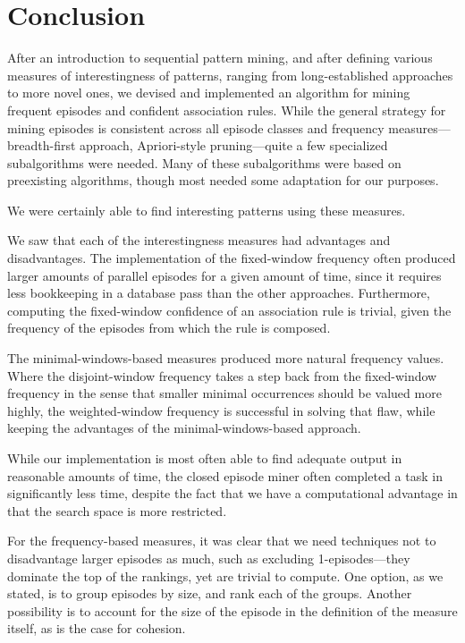 \chapter{Conclusion}


After an introduction to sequential pattern mining, and after defining various measures of interestingness of patterns, ranging from long-established approaches to more novel ones, we devised and implemented an algorithm for mining frequent episodes and confident association rules. While the general strategy for mining episodes is consistent across all episode classes and frequency measures---breadth-first approach, Apriori-style pruning---quite a few specialized subalgorithms were needed. Many of these subalgorithms were based on preexisting algorithms, though most needed some adaptation for our purposes.


We were certainly able to find interesting patterns using these measures.

We saw that each of the interestingness measures had advantages and disadvantages. The implementation of the fixed-window frequency often produced larger amounts of parallel episodes for a given amount of time, since it requires less bookkeeping in a database pass than the other approaches. Furthermore, computing the fixed-window confidence of an association rule is trivial, given the frequency of the episodes from which the rule is composed.

The minimal-windows-based measures produced more natural frequency values. Where the disjoint-window frequency takes a step back from the fixed-window frequency in the sense that smaller minimal occurrences should be valued more highly, the weighted-window frequency is successful in solving that flaw, while keeping the advantages of the minimal-windows-based approach.


While our implementation is most often able to find adequate output in reasonable amounts of time, the closed episode miner often completed a task in significantly less time, despite the fact that we have a computational advantage in that the search space is more restricted.

For the frequency-based measures, it was clear that we need techniques not to disadvantage larger episodes as much, such as excluding 1-episodes---they dominate the top of the rankings, yet are trivial to compute. One option, as we stated, is to group episodes by size, and rank each of the groups. Another possibility is to account for the size of the episode in the definition of the measure itself, as is the case for cohesion.

